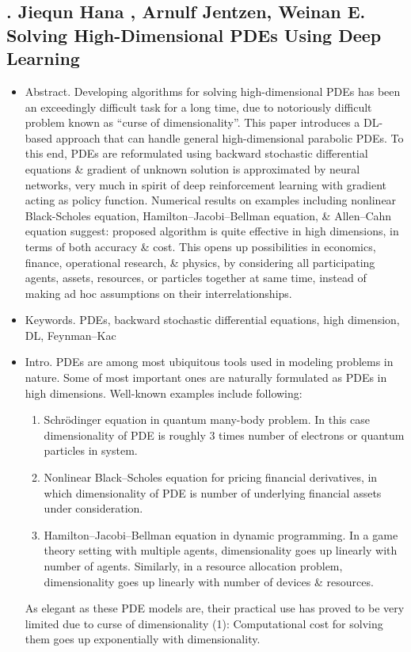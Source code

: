 \documentclass{article}
\begin{document}
\subsection{\cite{Han_Jentzen_Weinan2018}. {\sc Jiequn Hana , Arnulf Jentzen, Weinan E}. Solving High-Dimensional PDEs Using Deep Learning}
{\sf[2102 citations]}
\begin{itemize}
	\item {\sf Abstract.} Developing algorithms for solving high-dimensional PDEs has been an exceedingly difficult task for a long time, due to notoriously difficult problem known as ``curse of dimensionality''. This paper introduces a DL-based approach that can handle general high-dimensional parabolic PDEs. To this end, PDEs are reformulated using backward stochastic differential equations \& gradient of unknown solution is approximated by neural networks, very much in spirit of deep reinforcement learning with gradient acting as policy function. Numerical results on examples including nonlinear Black-Scholes equation, Hamilton--Jacobi--Bellman equation, \& Allen--Cahn equation suggest: proposed algorithm is quite effective in high dimensions, in terms of both accuracy \& cost. This opens up possibilities in economics, finance, operational research, \& physics, by considering all participating agents, assets, resources, or particles together at same time, instead of making ad hoc assumptions on their interrelationships.
	\item {\sf Keywords.} PDEs, backward stochastic differential equations, high dimension, DL, Feynman--Kac
	\item {\sf Intro.} PDEs are among most ubiquitous tools used in modeling problems in nature. Some of most important ones are naturally formulated as PDEs in high dimensions. Well-known examples include following:
	\begin{enumerate}
		\item Schr\"odinger equation in quantum many-body problem. In this case dimensionality of PDE is roughly 3 times number of electrons or quantum particles in system.
		\item Nonlinear Black--Scholes equation for pricing financial derivatives, in which dimensionality of PDE is number of underlying financial assets under consideration.
		\item Hamilton--Jacobi--Bellman equation in dynamic programming. In a game theory setting with multiple agents, dimensionality goes up linearly with number of agents. Similarly, in a resource allocation problem, dimensionality goes up linearly with number of devices \& resources.
	\end{enumerate}
	As elegant as these PDE models are, their practical use has proved to be very limited due to curse of dimensionality (1): Computational cost for solving them goes up exponentially with dimensionality.
	

\end{itemize}
\end{document}
